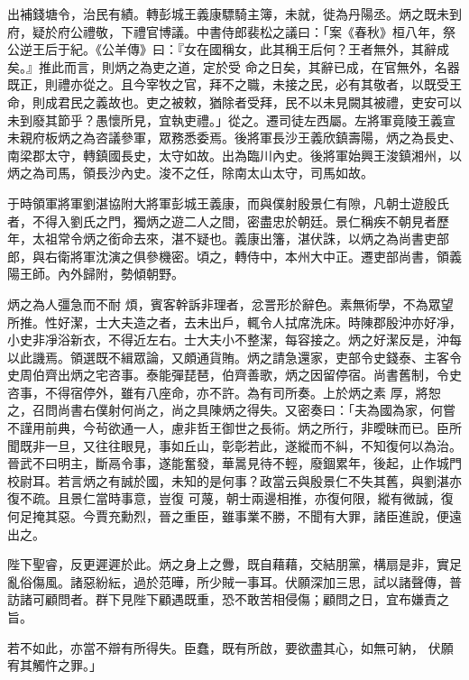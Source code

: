\begin{pinyinscope}
 出補錢塘令，治民有績。轉彭城王義康驃騎主簿，未就，徙為丹陽丞。炳之既未到府，疑於府公禮敬，下禮官博議。中書侍郎裴松之議曰：「案《春秋》桓八年，祭公逆王后于紀。《公羊傳》曰：『女在國稱女，此其稱王后何？王者無外，其辭成矣。』推此而言，則炳之為吏之道，定於受
 命之日矣，其辭已成，在官無外，名器既正，則禮亦從之。且今宰牧之官，拜不之職，未接之民，必有其敬者，以既受王命，則成君民之義故也。吏之被敕，猶除者受拜，民不以未見闕其被禮，吏安可以未到廢其節乎？愚懷所見，宜執吏禮。」從之。遷司徒左西屬。左將軍竟陵王義宣未親府板炳之為咨議參軍，眾務悉委焉。後將軍長沙王義欣鎮壽陽，炳之為長史、南梁郡太守，轉鎮國長史，太守如故。出為臨川內史。後將軍始興王浚鎮湘州，以
 炳之為司馬，領長沙內史。浚不之任，除南太山太守，司馬如故。



 于時領軍將軍劉湛協附大將軍彭城王義康，而與僕射殷景仁有隙，凡朝士遊殷氏者，不得入劉氏之門，獨炳之遊二人之間，密盡忠於朝廷。景仁稱疾不朝見者歷年，太祖常令炳之銜命去來，湛不疑也。義康出籓，湛伏誅，以炳之為尚書吏部郎，與右衛將軍沈演之俱參機密。頃之，轉侍中，本州大中正。遷吏部尚書，領義陽王師。內外歸附，勢傾朝野。



 炳之為人彊急而不耐
 煩，賓客幹訴非理者，忿詈形於辭色。素無術學，不為眾望所推。性好潔，士大夫造之者，去未出戶，輒令人拭席洗床。時陳郡殷沖亦好凈，小史非凈浴新衣，不得近左右。士大夫小不整潔，每容接之。炳之好潔反是，沖每以此譏焉。領選既不緝眾論，又頗通貨賄。炳之請急還家，吏部令史錢泰、主客令史周伯齊出炳之宅咨事。泰能彈琵琶，伯齊善歌，炳之因留停宿。尚書舊制，令史咨事，不得宿停外，雖有八座命，亦不許。為有司所奏。上於炳之素
 厚，將恕之，召問尚書右僕射何尚之，尚之具陳炳之得失。又密奏曰：「夫為國為家，何嘗不謹用前典，今茍欲通一人，慮非哲王御世之長術。炳之所行，非曖昧而已。臣所聞既非一旦，又往往眼見，事如丘山，彰彰若此，遂縱而不糾，不知復何以為治。晉武不曰明主，斷鬲令事，遂能奮發，華暠見待不輕，廢錮累年，後起，止作城門校尉耳。若言炳之有誠於國，未知的是何事？政當云與殷景仁不失其舊，與劉湛亦復不疏。且景仁當時事意，豈復
 可蔑，朝士兩邊相推，亦復何限，縱有微誠，復何足掩其惡。今賈充勳烈，晉之重臣，雖事業不勝，不聞有大罪，諸臣進說，便遠出之。



 陛下聖睿，反更遲遲於此。炳之身上之釁，既自藉藉，交結朋黨，構扇是非，實足亂俗傷風。諸惡紛紜，過於范曄，所少賊一事耳。伏願深加三思，試以諸聲傳，普訪諸可顧問者。群下見陛下顧遇既重，恐不敢苦相侵傷；顧問之日，宜布嫌責之旨。



 若不如此，亦當不辯有所得失。臣蠢，既有所啟，要欲盡其心，如無可納，
 伏願宥其觸忤之罪。」




\end{pinyinscope}
